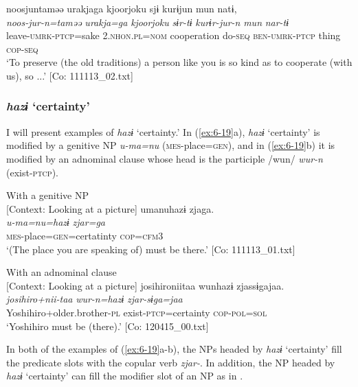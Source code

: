 {\TM}
\glll noosjuntaməə  urakjaga  {\textbar}kjoorjoku{\textbar}     sjɨ  kurɨjun  mun  natɨ,\\
     \textit{noos-jur-n=taməə}  \textit{urakja=ga}  \textit{kjoorjoku}     \textit{sɨr-tɨ}  \textit{kurɨr-jur-n}  \textit{mun}  \textit{nar-tɨ}\\
      leave-\textsc{umrk}-\textsc{ptcp}=sake  2.\textsc{nhon}.\textsc{pl}=\textsc{nom}  cooperation   do-\textsc{seq}  \textsc{ben}-\textsc{umrk}-\textsc{ptcp}  thing  \textsc{cop}-\textsc{seq}\\
\glt ‘To preserve (the old traditions) a person like you is so kind as to cooperate (with us), so ...’ [Co: 111113\_02.txt]
\z
\z

\subsubsection{\textit{hazɨ} ‘certainty’}

I will present examples of \textit{hazɨ} ‘certainty.’ In (\ref{ex:6-19}a), \textit{hazɨ} ‘certainty’ is modified by a genitive NP \textit{u-ma=nu} (\textsc{mes}-place=\textsc{gen}), and in (\ref{ex:6-19}b) it is modified by an adnominal clause whose head is the participle /wun/ \textit{wur-n} (exist-\textsc{ptcp}).

\ea\label{ex:6-19}
\ea With a genitive NP\\{}
[Context: Looking at a picture]
{\TM}
\glll umanuhazɨ  zjaga.\\
      \textit{u-ma=nu=hazɨ}  \textit{zjar=ga}\\
      \textsc{mes}-place=\textsc{gen}=certatinty  \textsc{cop}=\textsc{cfm}3\\
\glt ‘(The place you are speaking of) must be there.’ [Co: 111113\_01.txt]

\ex With an adnominal clause\\{}
[Context: Looking at a picture]
{\TM}
\glll josihironiitaa  wunhazɨ  zjassɨgajaa.\\
      \textit{josihiro+nii-taa}  \textit{wur-n=hazɨ}  \textit{zjar-sɨga=jaa}\\
      Yoshihiro+older.brother-\textsc{pl}  exist-\textsc{ptcp}=certainty  \textsc{cop}-\textsc{pol}=\textsc{sol}\\
\glt ‘Yoshihiro must be (there).’ [Co: 120415\_00.txt]
\z
\z

In both of the examples of (\ref{ex:6-19}a-b), the NPs headed by \textit{hazɨ} ‘certainty’ fill the predicate slots with the copular verb \textit{zjar-}. In addition, the NP headed by \textit{hazɨ} ‘certainty’ can fill the modifier slot of an NP as in .

